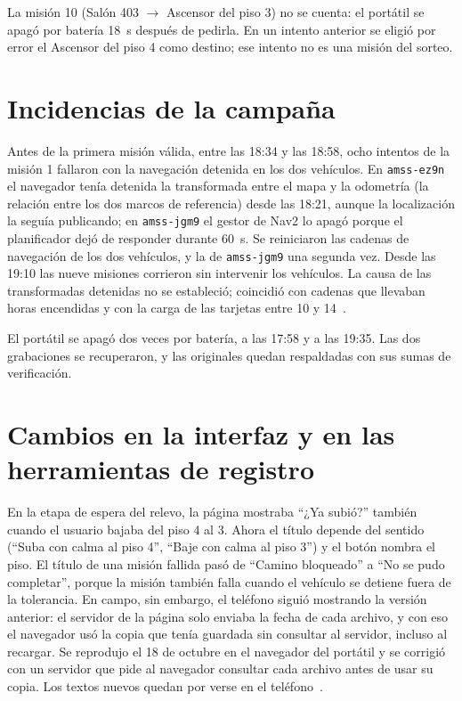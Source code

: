 \documentclass[12pt,letterpaper]{article}
\begin{document}
La misión 10 (Salón 403 $\rightarrow$ Ascensor del piso 3) no se cuenta: el portátil se apagó por batería 18~s después de pedirla. En un intento anterior se eligió por error el Ascensor del piso 4 como destino; ese intento no es una misión del sorteo.

\section{Incidencias de la campaña}

Antes de la primera misión válida, entre las 18:34 y las 18:58, ocho intentos de la misión 1 fallaron con la navegación detenida en los dos vehículos. En \texttt{amss-ez9n} el navegador tenía detenida la transformada entre el mapa y la odometría (la relación entre los dos marcos de referencia) desde las 18:21, aunque la localización la seguía publicando; en \texttt{amss-jgm9} el gestor de Nav2 lo apagó porque el planificador dejó de responder durante 60~s. Se reiniciaron las cadenas de navegación de los dos vehículos, y la de \texttt{amss-jgm9} una segunda vez. Desde las 19:10 las nueve misiones corrieron sin intervenir los vehículos. La causa de las transformadas detenidas no se estableció; coincidió con cadenas que llevaban horas encendidas y con la carga de las tarjetas entre 10 y 14~\cite{campana}.

El portátil se apagó dos veces por batería, a las 17:58 y a las 19:35. Las dos grabaciones se recuperaron, y las originales quedan respaldadas con sus sumas de verificación.

\section{Cambios en la interfaz y en las herramientas de registro}

En la etapa de espera del relevo, la página mostraba ``¿Ya subió?'' también cuando el usuario bajaba del piso 4 al 3. Ahora el título depende del sentido (``Suba con calma al piso 4'', ``Baje con calma al piso 3'') y el botón nombra el piso. El título de una misión fallida pasó de ``Camino bloqueado'' a ``No se pudo completar'', porque la misión también falla cuando el vehículo se detiene fuera de la tolerancia. En campo, sin embargo, el teléfono siguió mostrando la versión anterior: el servidor de la página solo enviaba la fecha de cada archivo, y con eso el navegador usó la copia que tenía guardada sin consultar al servidor, incluso al recargar. Se reprodujo el 18 de octubre en el navegador del portátil y se corrigió con un servidor que pide al navegador consultar cada archivo antes de usar su copia. Los textos nuevos quedan por verse en el teléfono~\cite{esquema}.
\end{document}
